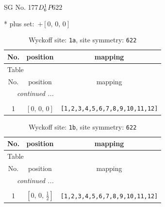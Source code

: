\documentclass[fleqn,8pt]{jsarticle}
\begin{document}
\setcounter{MaxMatrixCols}{32}

\renewcommand{\tablename}{Table~}
\renewcommand{\figurename}{Figure~}
\begin{center}
\LARGE
SG No. 177\quad$D_{\rm 6}^{1}$\quad$P622$\quad[ hexagonal ]
\end{center}
* plus set:\,\,\,$+\left[ 0,\, 0,\, 0 \right]$
\renewcommand{\arraystretch}{1.2}
\begin{longtable}{ccc}
\caption{Wyckoff site: {\tt 1a}, site symmetry: {\tt 622}}
 \\
 \hline \hline
No. & position & mapping \\ \hline \endfirsthead

\multicolumn{2}{l}{\tablename\ \thetable{}} \\
 \hline \hline
No. & position & mapping \\ \hline \endhead

 \hline \hline
\multicolumn{2}{r}{\footnotesize\it continued ...} \\ \endfoot

 \hline \hline
\multicolumn{2}{r}{} \\ \endlastfoot

1 & $\left[ 0,\, 0,\, 0 \right]$ & {\tt [1,2,3,4,5,6,7,8,9,10,11,12]} \\
\end{longtable}
\renewcommand{\arraystretch}{1.2}
\begin{longtable}{ccc}
\caption{Wyckoff site: {\tt 1b}, site symmetry: {\tt 622}}
 \\
 \hline \hline
No. & position & mapping \\ \hline \endfirsthead

\multicolumn{2}{l}{\tablename\ \thetable{}} \\
 \hline \hline
No. & position & mapping \\ \hline \endhead

 \hline \hline
\multicolumn{2}{r}{\footnotesize\it continued ...} \\ \endfoot

 \hline \hline
\multicolumn{2}{r}{} \\ \endlastfoot

1 & $\left[ 0,\, 0,\, \frac{1}{2} \right]$ & {\tt [1,2,3,4,5,6,7,8,9,10,11,12]} \\
\end{longtable}
\renewcommand{\arraystretch}{1.2}
\end{document}
